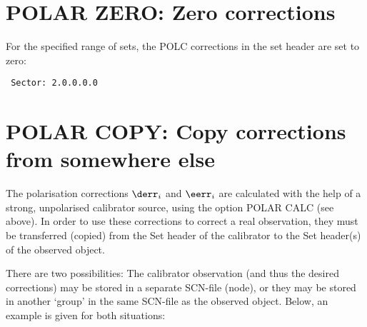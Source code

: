 \section{POLAR ZERO: Zero corrections}
\label{.zero}

For the specified range of sets, the POLC corrections in the set header are set
to zero:

\spbegin %
\spend %
%
\spbegin %
\spend %
%
\spbegin %
\svbegin \begin{verbatim}
 Sector: 2.0.0.0.0
\end{verbatim}\svend
\spend %
%
\spbegin %
\suser{\scr}
\spend %


\section{POLAR COPY: Copy corrections from somewhere else}
\label{.copy}

The polarisation corrections $\derr_i$ and $\eerr_i$  are calculated with the
help of a strong, unpolarised calibrator source, using the option POLAR CALC
(see above). In order to use these corrections to correct a real observation,
they must be transferred (copied) from the Set header of the calibrator to the
Set header(s) of the observed object.

There are two possibilities: The calibrator observation (and thus the desired
corrections) may be stored in a separate SCN-file (node), or they may be stored
in another `group' in the same SCN-file as the observed object. Below, an
example is given for both situations:

